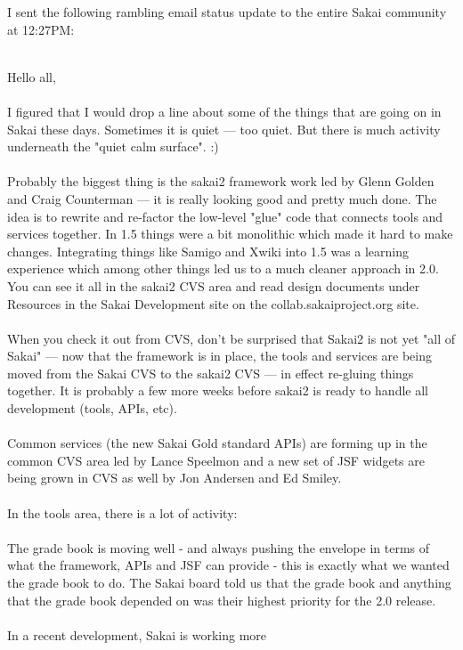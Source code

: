 \documentclass[12pt]{book}
\begin{document}
I sent the following rambling email status update to
the entire Sakai community at 12:27PM:\\
\\
\begin{sf}
Hello all,\\
\\
I figured that I would drop a line about some of the
things that are going on in Sakai these days.
Sometimes it is quiet --- too quiet. But there is much
activity underneath the "quiet calm surface".   :)\\
\\
Probably the biggest thing is the sakai2 framework
work led by Glenn Golden and Craig Counterman ---
it is really looking good and pretty much done.  The
idea is to rewrite and re-factor the low-level "glue"
code that connects tools and services together.  In
1.5 things were a bit monolithic which made it
hard to make changes. Integrating things like Samigo
and Xwiki into 1.5 was a learning experience which
among other things led us to a much cleaner
approach in 2.0.  You can see it all in the sakai2
CVS area and read design documents under Resources
in the Sakai Development site on the
collab.sakaiproject.org site.\\
\\
When you check it out from CVS, don't be surprised
that Sakai2 is not yet "all of Sakai" --- now that
the framework is in place, the tools and services
are being moved from the Sakai CVS to the sakai2
CVS --- in effect re-gluing things together.  It
is probably a few more weeks before sakai2 is ready to
handle all development (tools, APIs, etc).\\
\\
Common services (the new Sakai Gold standard APIs)
are forming up in the common CVS area led by Lance
Speelmon and a new set of JSF widgets are being
grown in CVS as well by Jon Andersen and Ed Smiley.\\
\\
In the tools area, there is a lot of activity:\\
\\
The grade book is moving well - and always pushing
the envelope in terms of what the framework, APIs
and JSF can provide - this is exactly what we
wanted the grade book to do.  The Sakai board told
us that the grade book and anything that the grade
book depended on was their highest priority for
the 2.0 release.  \\
\\
In a recent development, Sakai is working more

\end{sf}
\end{document}
